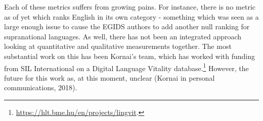 Each of these metrics suffers from growing pains. For instance, there is no metric as of yet which ranks English in its own category - something which was seen as a large enough issue to cause the EGIDS authors to add another null ranking for supranational languages. %
As well, there has not been an integrated approach looking at quantitative and qualitative measurements together. The most substantial work on this has been Kornai's team, which has worked with funding from SIL International on a Digital Language Vitality database.\footnote{\href{https://hlt.bme.hu/en/projects/lingvit}{https://hlt.bme.hu/en/projects/lingvit}. } However, the future for this work as, at this moment, unclear (Kornai in personal communications, 2018).


